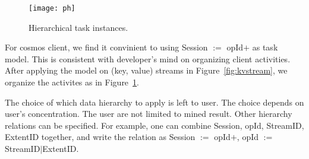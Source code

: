 \begin{figure}
\centering
\texttt{[image: ph]}
\caption{Hierarchical task instances.}
\label{fig:runtime}
\end{figure}

For cosmos client, we find it convinient to using Session
$:=$ opId$+$ as task model. This is consistent with
developer's mind on organizing client activities. After
applying the model on (key, value) streams in
Figure~\ref{fig:kvstream}, we organize the activites as in
Figure~\ref{fig:runtime}.

The choice of which data hierarchy to apply is left to user.
The choice depends on user's concentration. The user are not
limited to mined result. Other hierarchy relations can be
specified. For example, one can combine Session, opId,
StreamID, ExtentID together, and write the relation as
Session $:=$ opId$+$, opId $:=$ StreamID$|$ExtentID.

